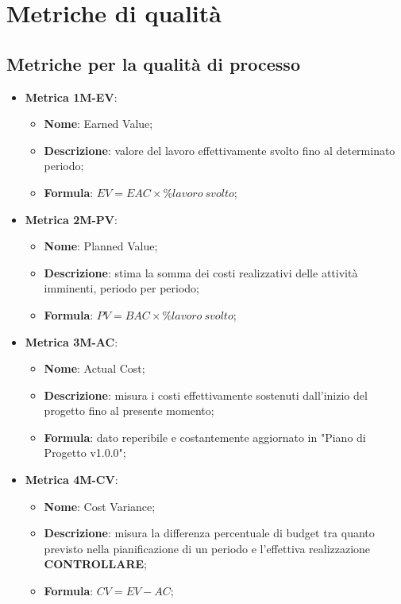 \section{Metriche di qualità}
\subsection{Metriche per la qualità di processo}
\begin{itemize}
    \item \textbf{Metrica 1M-EV}:
    \begin{itemize}
        \item \textbf{Nome}: Earned Value;
        \item \textbf{Descrizione}: valore del lavoro effettivamente svolto fino al determinato periodo;
        \item \textbf{Formula}: $EV = EAC \times \%lavoro\:svolto$;
    \end{itemize}
\end{itemize}

\begin{itemize}
    \item \textbf{Metrica 2M-PV}:
    \begin{itemize}
        \item \textbf{Nome}: Planned Value;
        \item \textbf{Descrizione}: stima la somma dei costi realizzativi delle attività imminenti, periodo per periodo;
        \item \textbf{Formula}: $PV = BAC \times \%lavoro\:svolto$;
    \end{itemize}
\end{itemize}

\begin{itemize}
    \item \textbf{Metrica 3M-AC}:
    \begin{itemize}
        \item \textbf{Nome}: Actual Cost;
        \item \textbf{Descrizione}: misura i costi effettivamente sostenuti dall'inizio del progetto fino al presente momento;
        \item \textbf{Formula}: dato reperibile e costantemente aggiornato in "Piano di Progetto v1.0.0";
    \end{itemize}
\end{itemize}

\begin{itemize}
    \item \textbf{Metrica 4M-CV}:
    \begin{itemize}
        \item \textbf{Nome}: Cost Variance;
        \item \textbf{Descrizione}: misura la differenza percentuale di budget tra quanto previsto nella pianificazione di un periodo e l'effettiva realizzazione \textbf{CONTROLLARE};
        \item \textbf{Formula}: $CV = EV - AC$;
    \end{itemize}
\end{itemize}

